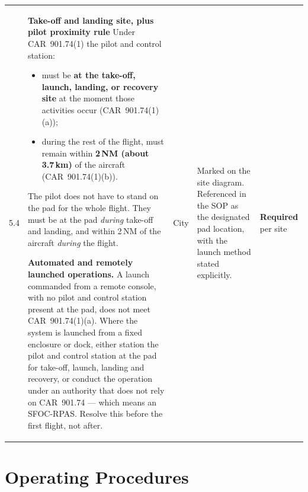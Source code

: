 \documentclass[11pt,letterpaper]{article}
\newcommand{\req}{\textbf{\color{uavwarn!85!black}Required}}
\begin{document}
\begin{longtable}{@{}L{0.28in} L{2.20in} L{0.85in} L{1.95in} L{0.85in}@{}}
5.4 &
{\textbf{Take-off and landing site, plus pilot proximity rule}\newline
\small\color{uavgrey}%
Under CAR~901.74(1) the pilot and control station:
\begin{itemize}[leftmargin=1em, itemsep=1pt, topsep=2pt, parsep=0pt]
  \item must be \textbf{at the take-off, launch, landing, or recovery
        site} at the moment those activities occur (CAR~901.74(1)(a));
  \item during the rest of the flight, must remain within
        \textbf{2\,NM (about 3.7\,km)} of the aircraft
        (CAR~901.74(1)(b)).
\end{itemize}
The pilot does not have to stand on the pad for the whole flight. They
must be at the pad \emph{during} take-off and landing, and within 2\,NM
of the aircraft \emph{during} the flight.

\textbf{Automated and remotely launched operations.} A launch commanded
from a remote console, with no pilot and control station present at the
pad, does not meet CAR~901.74(1)(a). Where the system is launched from
a fixed enclosure or dock, either station the pilot and control station
at the pad for take-off, launch, landing and recovery, or conduct the
operation under an authority that does not rely on CAR~901.74 --- which
means an SFOC-RPAS. Resolve this before the first flight, not after.} &
City &
Marked on the site diagram. Referenced in the SOP as the designated pad
location, with the launch method stated explicitly. &
\req{} per site \\

\end{longtable}

\newpage

\section{Operating Procedures}
\end{document}
